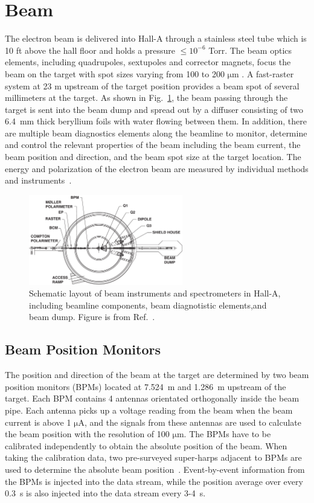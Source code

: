 \section{Beam}
 The electron beam is delivered into Hall-A through a stainless steel tube which is 10 ft above the hall floor and holds a pressure $\mathrm{\leq 10^{-6}}$ Torr. The beam optics elements, including quadrupoles, sextupoles and corrector magnets, focus the beam on the target with spot sizes varying from 100 to 200 $\mathrm{\mu m}$ . A fast-raster system at 23 m upstream of the target position provides a beam spot of several millimeters at the target. As shown in Fig.~\ref{whole_beam}\cite{halla_nim}, the beam passing through the target is sent into the beam dump and spread out by a diffuser consisting of two 6.4~mm thick beryllium foils with water flowing between them. In addition, there are multiple beam diagnostics elements along the beamline to monitor, determine and control the relevant properties of the beam including the beam current, the beam position and direction, and the beam spot size at the target location. The energy and polarization of the electron beam are measured by individual methods and instruments~\cite{halla_nim}. 
\begin{figure}[!ht]
 \begin{center}
  \includegraphics[width=0.6\textwidth]{./figures/halla_jlab/wholehall}
  \caption[Schematic layout of beam instruments and spectrometers in Hall-A]{\footnotesize{Schematic layout of beam instruments and spectrometers in Hall-A, including beamline components, beam diagnotistic elements,and beam dump. Figure is from Ref.~\cite{halla_nim}.}}
  \label{whole_beam}
 \end{center}
\end{figure}
\subsection{Beam Position Monitors}
 The position and direction of the beam at the target are determined by two beam position monitors (BPMs) located at 7.524~m and 1.286~m upstream of the target. Each BPM contains 4 antennas orientated orthogonally inside the beam pipe. Each antenna picks up a voltage reading from the beam when the beam current is above 1 $\mathrm{\mu A}$, and the signals from these antennas are used to calculate the beam position with the resolution of 100 $\mathrm{\mu m}$. The BPMs have to be calibrated independently to obtain the absolute position of the beam. When taking the calibration data, two pre-surveyed super-harps adjacent to BPMs are used to determine the absolute beam position~\cite{bpm_cali}. Event-by-event information from the BPMs is injected into the data stream, while the position average over every 0.3~s is also injected into the data stream every 3-4~s.

